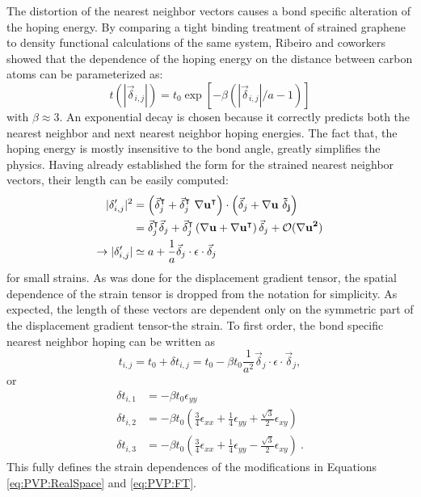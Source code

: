 The distortion of the nearest neighbor vectors causes a bond specific alteration of the hoping energy.
By comparing a tight binding treatment of strained graphene to density functional calculations of the same system, Ribeiro and coworkers showed that the dependence of the hoping energy on the distance between carbon atoms can be parameterized as:
\begin{equation*}
  t(|\vec{\delta}_{i,j}|)=t_0 \exp[-\beta (|\vec{\delta}_{i,j}|/a-1)]
\end{equation*}
with $\beta\approx 3$\cite{Pereira2009,Ribeiro2009,CastroNeto2009}.
An exponential decay is chosen because it correctly predicts both the nearest neighbor and next nearest neighbor hoping energies.
The fact that, the hoping energy is mostly insensitive to the bond angle, greatly simplifies the physics.
Having already established the form for the strained nearest neighbor vectors, their length can be easily computed:
\begin{align*}
  |\delta'_{i,j}|^2&=\left(\vec{\delta}_{j}^{\intercal}+\vec{\delta}_{j}^{\intercal} \ \bf{\nabla u}^{\intercal} \right) \cdot
    \left(\vec{\delta}_{j}+\bf{\nabla u} \ \vec{\delta}_{j} \right) \\
    &=\vec{\delta}_{j}^{\intercal} \vec{\delta}_{j}+
      \vec{\delta}_{j}^{\intercal} \left(\bf{\nabla u}+\bf{\nabla u}^{\intercal} \right) \vec{\delta}_{j}+
      \mathcal{O}(\bf{\nabla u}^2) \\
  \rightarrow |\delta'_{i,j}|&\simeq a+\frac{1}{a} \vec{\delta}_{j} \cdot \epsilon \cdot \vec{\delta}_{j}
\end{align*}
for small strains.
As was done for the displacement gradient tensor, the spatial dependence of the strain tensor is dropped from the notation for simplicity.
As expected, the length of these vectors are dependent only on the symmetric part of the displacement gradient tensor-the strain.
To first order, the bond specific nearest neighbor hoping can be written as
\begin{equation*}
  t_{i,j}=t_0+\delta t_{i,j}=t_0-\beta t_0 \frac{1}{a^2} \vec{\delta}_{j} \cdot \epsilon \cdot \vec{\delta}_{j},
\end{equation*}
or
\begin{align}
  \delta t_{i,1}&=-\beta t_0 \epsilon_{yy} \nonumber \\
  \delta t_{i,2}&=-\beta t_0 \left( \frac{3}{4}\epsilon_{xx} +\frac{1}{4} \epsilon_{yy} + \frac{\sqrt{3}}{2} \epsilon_{xy} \right) \nonumber \\
  \delta t_{i,3}&=-\beta t_0 \left( \frac{3}{4}\epsilon_{xx} +\frac{1}{4} \epsilon_{yy} - \frac{\sqrt{3}}{2} \epsilon_{xy} \right)  \label{eq:PVP:dtij}\ .
\end{align}
This fully defines the strain dependences of the modifications in Equations \ref{eq:PVP:RealSpace} and \ref{eq:PVP:FT}.

